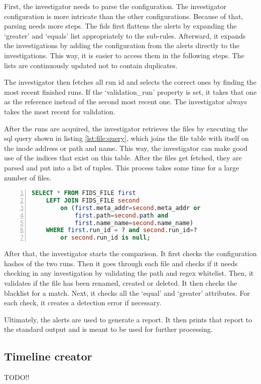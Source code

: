 First, the investigator needs to parse the configuration. The investigator configuration is more intricate than the other configurations. Because of that, parsing needs more steps. The \gls{fids} first flattens the alerts by expanding the `greater' and `equals' list appropriately to the sub-rules. Afterward, it expands the investigations by adding the configuration from the alerts directly to the investigations. This way, it is easier to access them in the following steps. The lists are continuously updated not to contain duplicates.

The investigator then fetches all run \gls{id} and selects the correct ones by finding the most recent finished runs. If the `validation\_run' property is set, it takes that one as the reference instead of the second most recent one. The investigator always takes the most recent for validation.

After the runs are acquired, the investigator retrieves the files by executing the \gls{sql} query shown in listing \ref{lst:file:query}, which joins the file table with itself on the inode address or path and name. This way, the investigator can make good use of the indices that exist on this table. After the files get fetched, they are parsed and put into a list of tuples. This process takes some time for a large number of files. 

\begin{lstlisting}[language=sql, numbers=left, caption=SQL Querry for files, label=lst:file:query]
SELECT * FROM FIDS_FILE first 
    LEFT JOIN FIDS_FILE second 
        on (first.meta_addr=second.meta_addr or 
            first.path=second.path and 
            first.name_name=second.name_name)
    WHERE first.run_id = ? and second.run_id=? 
        or second.run_id is null;
\end{lstlisting}

After that, the investigator starts the comparison. It first checks the configuration hashes of the two runs. Then it goes through each file and checks if it needs checking in any investigation by validating the path and \gls{regex} whitelist. Then, it validates if the file has been renamed, created or deleted. It then checks the blacklist for a match.  Next, it checks all the `equal' and `greater' attributes. For each check, it creates a detection error if necessary. 

Ultimately, the alerts are used to generate a report. It then prints that report to the standard output and is meant to be used for further processing. 

\subsection{Timeline creator}
\label{sec:Timeliner}

TODO!!